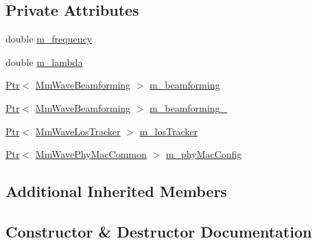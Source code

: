 \subsection*{Private Attributes}
\begin{DoxyCompactItemize}
\item 
double \hyperlink{classns3_1_1BuildingsObstaclePropagationLossModel_ab1402776d426a463ffc3afc272aecf4a}{m\+\_\+frequency}
\item 
double \hyperlink{classns3_1_1BuildingsObstaclePropagationLossModel_a9458e5626cd41b80c52ea62e3f3c8b2d}{m\+\_\+lambda}
\item 
\hyperlink{classns3_1_1Ptr}{Ptr}$<$ \hyperlink{classns3_1_1MmWaveBeamforming}{Mm\+Wave\+Beamforming} $>$ \hyperlink{classns3_1_1BuildingsObstaclePropagationLossModel_a8cb53b5a1895e0166a67603cac7a543d}{m\+\_\+beamforming}
\item 
\hyperlink{classns3_1_1Ptr}{Ptr}$<$ \hyperlink{classns3_1_1MmWaveBeamforming}{Mm\+Wave\+Beamforming} $>$ \hyperlink{classns3_1_1BuildingsObstaclePropagationLossModel_af6449b3652bee881fcb6a1f0e4ef8227}{m\+\_\+beamforming\+\_}
\item 
\hyperlink{classns3_1_1Ptr}{Ptr}$<$ \hyperlink{classns3_1_1MmWaveLosTracker}{Mm\+Wave\+Los\+Tracker} $>$ \hyperlink{classns3_1_1BuildingsObstaclePropagationLossModel_a83f238f872f055847c5b938a3ac1ceaf}{m\+\_\+los\+Tracker}
\item 
\hyperlink{classns3_1_1Ptr}{Ptr}$<$ \hyperlink{classns3_1_1MmWavePhyMacCommon}{Mm\+Wave\+Phy\+Mac\+Common} $>$ \hyperlink{classns3_1_1BuildingsObstaclePropagationLossModel_a381a30a4251756853831782b3e58c721}{m\+\_\+phy\+Mac\+Config}
\end{DoxyCompactItemize}
\subsection*{Additional Inherited Members}


\subsection{Constructor \& Destructor Documentation}
